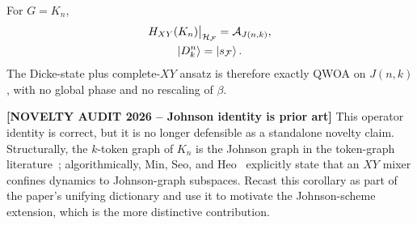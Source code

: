 \begin{corollary}
\label{cor:dicke-xy-johnson}
For $G=K_n$,
\begin{equation}
\begin{gathered}
    H_{XY}(K_n)\big|_{\mathcal{H}_{\mathcal{F}}}=\mathcal{A}_{J(n,k)},\\
\ket{D^n_k}=\ket{s_{\mathcal{F}}} .
\end{gathered}
\end{equation}
The Dicke-state plus complete-$XY$ ansatz is therefore exactly QWOA on $J(n,k)$, with no global phase and no rescaling of $\beta$.
\end{corollary}

{\color{red}\textbf{[NOVELTY AUDIT 2026 -- Johnson identity is prior art]} This operator identity is correct, but it is no longer defensible as a standalone novelty claim. Structurally, the $k$-token graph of $K_n$ is the Johnson graph in the token-graph literature~\cite{FabilaMonroy2012Token}; algorithmically, Min, Seo, and Heo~\cite{MinSeoHeo2026} explicitly state that an $XY$ mixer confines dynamics to Johnson-graph subspaces. Recast this corollary as part of the paper's unifying dictionary and use it to motivate the Johnson-scheme extension, which is the more distinctive contribution.}

